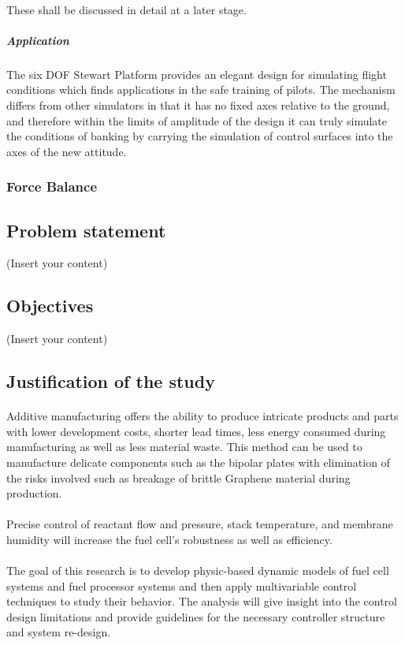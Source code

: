 \paragraph{}These shall be discussed in detail at a later stage.

\subparagraph{Application}
\paragraph{}The six DOF Stewart Platform provides an elegant design for simulating flight conditions which finds applications in the safe training of pilots. The mechanism differs from other simulators in that it has no fixed axes relative to the ground, and therefore within the limits of amplitude of the design it can truly simulate the conditions of banking by carrying the simulation of control surfaces into the axes of the new attitude.

\subsubsection{Force Balance}
\subsection{Problem statement}
(Insert your content)
\subsection{Objectives}
(Insert your content)
\subsection{Justification of the study}
\paragraph{}Additive manufacturing offers the ability to produce intricate products and parts with lower development costs, shorter lead times, less energy consumed during manufacturing as well as less material waste. This method can be used to manufacture delicate components such as the bipolar plates with elimination of the risks involved such as breakage of brittle Graphene material during production.     
\paragraph{}Precise control of reactant flow and pressure, stack temperature, and membrane humidity will increase the fuel cell’s robustness as well as efficiency.
\paragraph{}The goal of this research is to develop physic-based dynamic models of fuel cell systems and fuel processor systems and then apply multivariable control techniques to study their behavior. The analysis will give insight into the control design limitations and provide guidelines for the necessary controller structure and system re-design.
